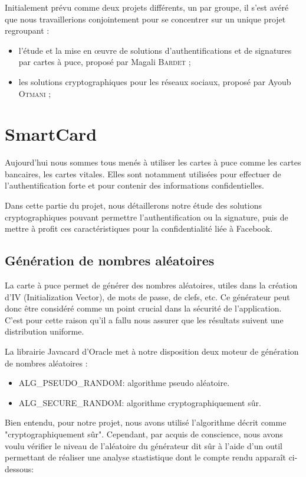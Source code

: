 \documentclass[a4paper,11pt,french]{article}
\begin{document}
Initialement prévu comme deux projets différents, un par groupe, il s'est avéré 
que nous travaillerions conjointement pour se concentrer sur un unique projet 
regroupant :
\begin{itemize}
    \item l'étude et la mise en \oe{}uvre de solutions d’authentifications et 
        de signatures par cartes à puce, proposé par Magali \textsc{Bardet} ;
\item les solutions cryptographiques pour les réseaux sociaux, proposé par Ayoub
    \textsc{Otmani} ;
\end{itemize}

\section{SmartCard}
Aujourd'hui nous sommes tous menés à utiliser les cartes à puce comme les cartes
bancaires, les cartes vitales. Elles sont notamment utilisées pour effectuer de 
l'authentification forte et pour contenir des informations confidentielles.

Dans cette partie du projet, nous détaillerons notre étude des solutions 
cryptographiques pouvant permettre l'authentification ou la signature, puis de 
mettre à profit ces caractéristiques pour la confidentialité liée à Facebook.


\subsection{Génération de nombres aléatoires}
La carte à puce permet de générer des nombres aléatoires, utiles dans la création
d'IV (Initialization Vector), de mots de passe, de clefs, etc. Ce générateur 
peut donc être considéré comme un point crucial dans la sécurité de l'application.
C'est pour cette raison qu'il a fallu nous assurer que les résultats suivent une
distribution uniforme. 

La librairie Javacard d'Oracle met à notre disposition deux moteur de génération
de nombres aléatoires :
\begin{itemize} 
	\item ALG\_PSEUDO\_RANDOM: algorithme pseudo aléatoire.
	\item ALG\_SECURE\_RANDOM: algorithme cryptographiquement sûr.
\end{itemize}

Bien entendu, pour notre projet, nous avons utilisé l'algorithme décrit comme 
"cryptographiquement sûr". Cependant, par acquis de conscience, nous avons voulu
vérifier le niveau de l'aléatoire du générateur dit sûr à l'aide d'un
outil permettant de réaliser une analyse stastistique dont le compte rendu
apparaît ci-dessous:
\end{document}
